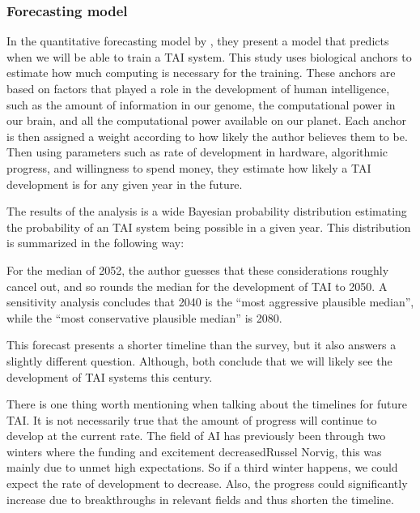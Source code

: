 \documentclass[12pt,A4]{report}
\newcommand{\autobaj}{}
\theoremstyle{definition}
\begin{document}
\subsubsection{Forecasting model}
In the quantitative forecasting model by \citet{Ajeya}, they present a model that predicts when we will be able to train a TAI system. This study uses biological anchors to estimate how much computing is necessary for the training. These anchors are based on factors that played a role in the development of human intelligence, such as the amount of information in our genome, the computational power in our brain, and all the computational power available on our planet. Each anchor is then assigned a weight according to how likely the author believes them to be. Then using parameters such as rate of development in hardware, algorithmic progress, and willingness to spend money, they estimate how likely a TAI development is for any given year in the future. 

The results of the analysis is a wide Bayesian probability distribution estimating the probability of an TAI system being possible in a given year. This distribution is summarized in \citet{an121} the following way:
\begin{displayquote}
For the median of 2052, the author guesses that these considerations roughly cancel out, and so rounds the median for the development of TAI to 2050. A sensitivity analysis concludes that 2040 is the “most aggressive plausible median”, while the “most conservative plausible median” is 2080.
\end{displayquote}
This forecast presents a shorter timeline than the survey, but it also answers a slightly different question. Although, both conclude that we will likely see the development of TAI systems this century.  

There is one thing worth mentioning when talking about the timelines for future TAI. It is not necessarily true that the amount of progress will continue to develop at the current rate. The field of AI has previously been through two winters where the funding and excitement decreased\autobaj{Russel Norvig}, this was mainly due to unmet high expectations. So if a third winter happens, we could expect the rate of development to decrease. Also, the progress could significantly increase due to breakthroughs in relevant fields and thus shorten the timeline.

\end{document}
